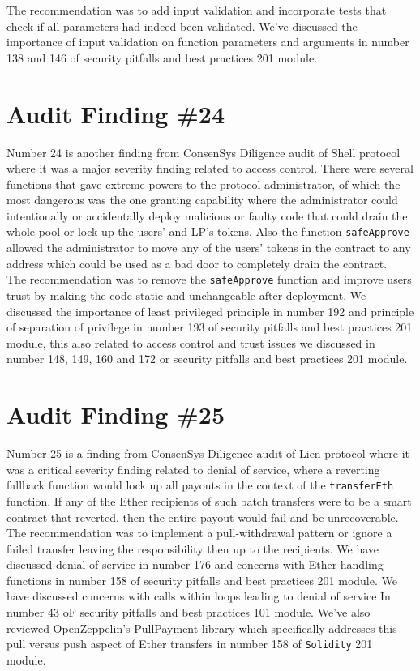 The recommendation was to add input validation and incorporate tests that check if all parameters had indeed been validated. We've discussed the importance of input validation on function parameters and arguments in number 138 and 146 of security pitfalls and best practices 201 module.

\section{Audit Finding \#24}

Number 24 is another finding from ConsenSys Diligence audit of Shell protocol where it was a major severity finding related to access control. There were several functions that gave extreme powers to the protocol administrator, of which the most dangerous was the one granting capability where the administrator could intentionally or accidentally deploy malicious or faulty code that could drain the whole pool or lock up the users' and LP's tokens. Also the function \verb|safeApprove| allowed the administrator to move any of the users' tokens in the contract to any address which could be used as a bad door to completely drain the contract.\\

The recommendation was to remove the \verb|safeApprove| function and improve users trust by making the code static and unchangeable after deployment. We discussed the importance of least privileged principle in number 192 and principle of separation of privilege in number 193 of security pitfalls and best practices 201 module, this also related to access control and trust issues we discussed in number 148, 149, 160 and 172 or security pitfalls and best practices 201 module.

\section{Audit Finding \#25}

Number 25 is a finding from ConsenSys Diligence audit of Lien protocol where it was a critical severity finding related to denial of service, where a reverting fallback function would lock up all payouts in the context of the \verb|transferEth| function. If any of the Ether recipients of such batch transfers were to be a smart contract that reverted, then the entire payout would fail and be unrecoverable.\\

The recommendation was to implement a pull-withdrawal pattern or ignore a failed transfer leaving the responsibility then up to the recipients. We have discussed denial of service in number 176 and concerns with Ether handling functions in number 158 of security pitfalls and best practices 201 module. We have discussed concerns with calls within loops leading to denial of service In number 43 oF security pitfalls and best practices 101 module. We've also reviewed OpenZeppelin's PullPayment library which specifically addresses this pull versus push aspect of Ether transfers in number 158 of \verb|Solidity| 201 module.

